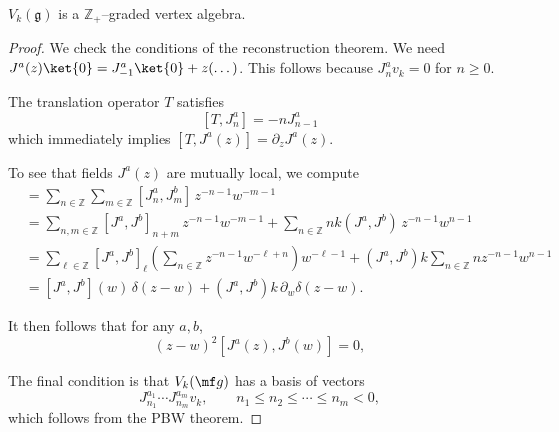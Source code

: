 \documentclass[12pt]{article}
\begin{document}
\begin{theorem}
    $V_k(\mathfrak{g})$ is a $\mathbb{Z}_+$–graded vertex algebra.
\end{theorem}

\begin{proof}
    We check the conditions of the reconstruction theorem.
    We need $J^a(z)\ket{0} = J^a_{-1}\ket{0} + z(\dots)$. This follows because $J^a_n v_k = 0$ for $n\ge0$.

    The translation operator $T$ satisfies \[[T,J^a_n] = -n J^a_{n-1}\] which immediately implies $[T,J^a(z)] = \partial_z J^a(z)$.

    To see that fields $J^a(z)$ are mutually local, we compute \begin{align*}
        [J^a(z),J^b(w)]
         & = \sum_{n\in\mathbb{Z}}\sum_{m\in\mathbb{Z}} [J^a_n, J^b_m]\,z^{-n-1}w^{-m-1} \\[4pt]
         & = \sum_{n,m\in\mathbb{Z}} [J^a,J^b]_{n+m}\,z^{-n-1}w^{-m-1}
        + \sum_{n\in\mathbb{Z}} n k (J^a,J^b)\,z^{-n-1}w^{n-1}                           \\[4pt]
         & = \sum_{\ell\in\mathbb{Z}} [J^a,J^b]_\ell
        \left( \sum_{n\in\mathbb{Z}} z^{-n-1}w^{-\ell+n} \right) w^{-\ell-1}
        + (J^a,J^b)k \sum_{n\in\mathbb{Z}} n z^{-n-1}w^{n-1}                             \\[4pt]
         & = [J^a,J^b](w)\,\delta(z-w)
        + (J^a,J^b)k\,\partial_w\delta(z-w).
    \end{align*}

    It then follows that for any $a,b$,
    \[
        (z-w)^2 [J^a(z),J^b(w)] = 0,
    \]

    The final condition is that $V_k(\mf g)$ has a basis of vectors
    \[J^{a_1}_{n_1} \cdots J^{a_m}_{n_m} v_k,\qquad n_1\le n_2 \le \cdots \le n_m < 0,\]
    which follows from the PBW theorem.
\end{proof}
\end{document}
